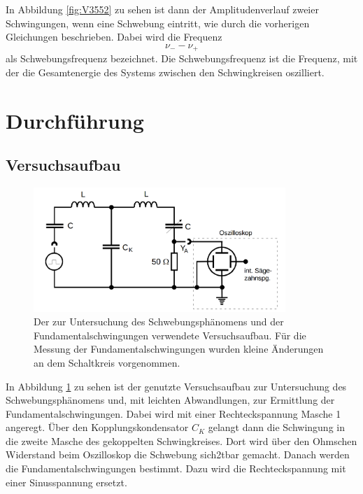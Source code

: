 \documentclass[
  bibliography=totoc,     %
  captions=tableheading,  %
  titlepage=firstiscover, %
]{scrartcl}
\begin{document}
In Abbildung \ref{fig:V3552} zu sehen ist dann der Amplitudenverlauf zweier
Schwingungen, wenn eine Schwebung eintritt, wie durch die vorherigen Gleichungen
beschrieben. Dabei wird die Frequenz
\begin{equation}
\nu_--\nu_+
\label{eqn:Lörres}
\end{equation}
als Schwebungsfrequenz bezeichnet. Die Schwebungsfrequenz ist die Frequenz, mit
der die Gesamtenergie des Systems zwischen den Schwingkreisen oszilliert.
\section{Durchführung}
\label{sec:durchführung}

\subsection{Versuchsaufbau}
\label{sec:versuchsaufbau}
\begin{figure}[htb]
  \centering
  \includegraphics[width=0.85\textwidth]{V3554.png}
  \caption{Der zur Untersuchung des Schwebungsphänomens und der Fundamentalschwingungen verwendete Versuchsaufbau. Für die Messung der Fundamentalschwingungen wurden kleine Änderungen an dem Schaltkreis vorgenommen.}
  \label{fig:V3554}
\end{figure}
In Abbildung \ref{fig:V3554} zu sehen ist der genutzte Versuchsaufbau zur
Untersuchung des Schwebungsphänomens und, mit leichten Abwandlungen, zur
Ermittlung der Fundamentalschwingungen. Dabei wird mit einer Rechteckspannung
Masche 1 angeregt. Über den Kopplungskondensator $C_K$ gelangt dann
die Schwingung in die zweite Masche des gekoppelten Schwingkreises. Dort wird
über den Ohmschen Widerstand beim Oszilloskop die Schwebung sich2tbar gemacht.
Danach werden die Fundamentalschwingungen bestimmt. Dazu wird die Rechteckspannung
mit einer Sinusspannung ersetzt.
\end{document}
